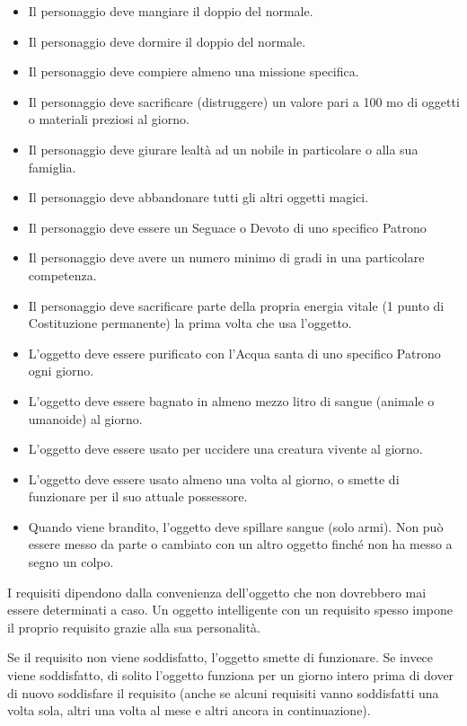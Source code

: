 \begin{multicols}{2}
\begin{itemize}[leftmargin=*] \setlength{\itemsep}{0pt}
\item Il personaggio deve mangiare il doppio del normale.
\item Il personaggio deve dormire il doppio del normale.
\item Il personaggio deve compiere almeno una missione specifica.
\item Il personaggio deve sacrificare (distruggere) un valore pari a 100 mo di oggetti o materiali preziosi al giorno.
\item Il personaggio deve giurare lealtà ad un nobile in particolare o alla sua famiglia.
\item Il personaggio deve abbandonare tutti gli altri oggetti magici.
\item Il personaggio deve essere un Seguace o Devoto di uno specifico Patrono
\item Il personaggio deve avere un numero minimo di gradi in una particolare competenza.
\item Il personaggio deve sacrificare parte della propria energia vitale (1 punto di Costituzione permanente) la prima volta che usa l'oggetto.
\item L'oggetto deve essere purificato con l'Acqua santa di uno specifico Patrono ogni giorno.
\item L'oggetto deve essere bagnato in almeno mezzo litro di sangue (animale o umanoide) al giorno.
\item L'oggetto deve essere usato per uccidere una creatura vivente al giorno.
\item L'oggetto deve essere usato almeno una volta al giorno, o smette di funzionare per il suo attuale possessore.
\item Quando viene brandito, l'oggetto deve spillare sangue (solo armi). Non può essere messo da parte o cambiato con un altro oggetto finché non ha messo a segno un colpo.
\end{itemize}

I requisiti dipendono dalla convenienza dell'oggetto che non dovrebbero mai essere determinati a caso. Un oggetto intelligente con un requisito spesso impone il proprio requisito grazie alla sua personalità.

Se il requisito non viene soddisfatto, l'oggetto smette di funzionare. Se invece viene soddisfatto, di solito l'oggetto funziona per un giorno intero prima di dover di nuovo soddisfare il requisito (anche se alcuni requisiti vanno soddisfatti una volta sola, altri una volta al mese e altri ancora in continuazione).


\end{multicols}
